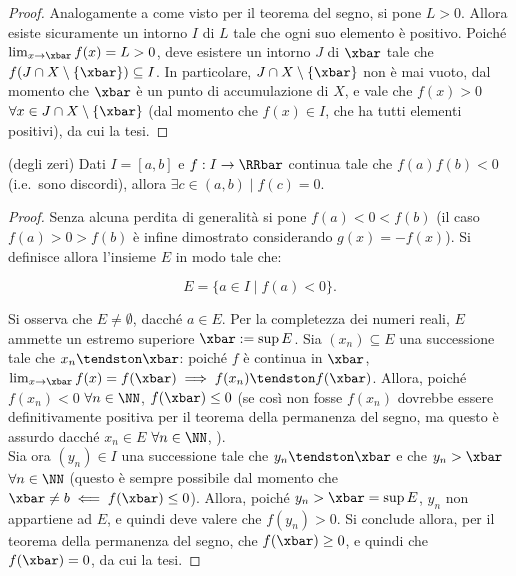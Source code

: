\documentclass[11pt]{article}
\begin{document}
	\begin{proof}
		Analogamente a come visto per il teorema del segno, si pone $L > 0$. Allora esiste sicuramente un intorno $I$ di $L$ tale che ogni suo elemento è positivo. Poiché $\lim_{x \to \xbar} f(x) = L > 0$, deve esistere un intorno $J$ di
		$\xbar$ tale che $f(J \cap X \setminus \{\xbar\}) \subseteq I$. In particolare, $J \cap X \setminus \{\xbar\}$ non
		è mai vuoto, dal momento che $\xbar$ è un punto di accumulazione di $X$, e vale che $f(x) > 0$ $\forall x \in J \cap X \setminus \{\xbar\}$ (dal momento che $f(x) \in I$, che ha tutti elementi positivi), da cui la tesi.
	\end{proof}
	
	\begin{theorem} (degli zeri) Dati $I = [a, b]$ e
		$f : I \to \RRbar$ continua tale che $f(a) f(b) < 0$ (i.e.~sono discordi), allora $\exists c \in (a, b) \mid f(c) = 0$.
	\end{theorem}

	\begin{proof}
		Senza alcuna perdita di generalità si pone $f(a) < 0 < f(b)$ (il caso $f(a) > 0 > f(b)$ è
		infine dimostrato considerando $g(x) = -f(x)$). Si definisce allora l'insieme $E$ in modo tale che:
		
		\[ E = \{ a \in I \mid f(a) < 0 \}. \]
		
		\vskip 0.05in
		
		Si osserva che $E \neq \emptyset$, dacché $a \in E$. Per la completezza dei numeri reali,
		$E$ ammette un estremo superiore $\xbar := \sup E$. Sia $(x_n) \subseteq E$ una successione
		tale che $x_n \tendston \xbar$: poiché $f$ è continua in $\xbar$, $\lim_{x \to \xbar} f(x) = f(\xbar) \implies
		f(x_n) \tendston f(\xbar)$. Allora, poiché $f(x_n) < 0$ $\forall n \in \NN$, $f(\xbar) \leq 0$ (se così non fosse
		$f(x_n)$ dovrebbe essere definitivamente positiva per il teorema della permanenza del segno, ma questo
		è assurdo dacché $x_n \in E$ $\forall n \in \NN$, \Lightning). \\
		
		Sia ora $(y_n) \in I$ una successione tale che $y_n \tendston \xbar$ e che $y_n > \xbar$ $\forall n \in \NN$ (questo
		è sempre possibile dal momento che $\xbar \neq b \impliedby f(\xbar) \leq 0$). Allora,
		poiché $y_n > \xbar = \sup E$, $y_n$ non appartiene ad $E$, e quindi deve valere che $f(y_n) > 0$. Si conclude
		allora, per il teorema della permanenza del segno, che $f(\xbar) \geq 0$, e quindi che $f(\xbar) = 0$, da cui
		la tesi.
	\end{proof}
\end{document}
